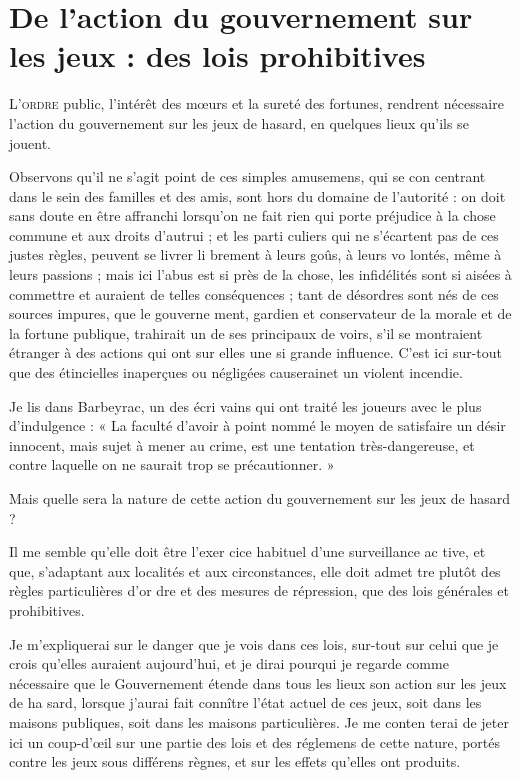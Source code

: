 \chapter
  [De l'action du Gouvernement sur les Jeux. Des lois prohibitives]
  {De l'action du gouvernement sur les jeux : des lois prohibitives}

\lettrine{L}{'ordre} public, l'intérêt des m{\oe}urs
et la sureté des fortunes, rendrent
nécessaire l'action du gouvernement
sur les jeux de hasard, en quelques
lieux qu'ils se jouent.

Observons qu'il ne s'agit point de
ces simples amusemens, qui se con%
centrant dans le sein des familles et
des amis, sont hors du domaine de
l'autorité : on doit sans doute en être
affranchi lorsqu'on ne fait rien qui
porte préjudice à la chose commune
et aux droits d'autrui ; et les parti%
culiers qui ne s'écartent pas de ces
justes règles, peuvent se livrer li%
brement à leurs goûs, à leurs vo%
lontés, même à leurs passions ; mais
ici l'abus est si près de la chose, les
infidélités sont si aisées à commettre
et auraient de telles conséquences ;
tant de désordres sont nés de ces
sources impures, que le gouverne%
ment, gardien et conservateur de la 
morale et de la fortune publique,
trahirait un de ses principaux de%
voirs, s'il se montraient étranger à des
actions qui ont sur elles une si grande
influence. C'est ici sur-tout que des
étincielles inaperçues ou négligées
causerainet un violent incendie.

Je lis dans Barbeyrac, un des écri%
vains qui ont traité les joueurs avec
le plus d'indulgence : « La faculté
d'avoir à point nommé le moyen
de satisfaire un désir innocent,
mais sujet à mener au crime, est
une tentation très-dangereuse, et
contre laquelle on ne saurait trop
se précautionner. »

Mais quelle sera la nature de cette
action du gouvernement sur les jeux
de hasard ?

Il me semble qu'elle doit être l'exer%
cice habituel d'une surveillance ac%
tive, et que, s'adaptant aux localités
et aux circonstances, elle doit admet%
tre plutôt des règles particulières d'or%
dre et des mesures de répression, que
des lois générales et prohibitives.

Je m'expliquerai sur le danger que
je vois dans ces lois, sur-tout sur
celui que je crois qu'elles auraient
aujourd'hui, et je dirai pourqui je
regarde comme nécessaire que le
Gouvernement étende dans tous les
lieux son action sur les jeux de ha%
sard, lorsque j'aurai fait connître
l'état actuel de ces jeux, soit dans
les maisons publiques, soit dans les
maisons particulières. Je me conten%
terai de jeter ici un coup-d'{\oe}il sur
une partie des lois et des réglemens
de cette nature, portés contre les jeux
sous différens règnes, et sur les effets
qu'elles ont produits.

